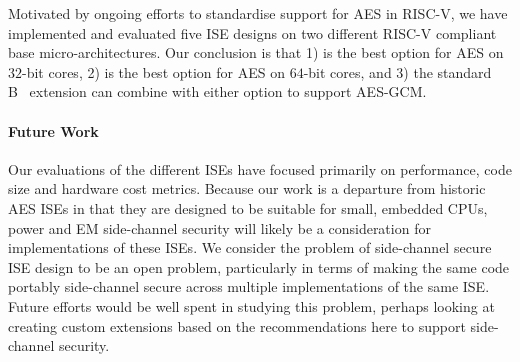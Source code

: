 

Motivated by ongoing efforts to standardise support 
for AES in RISC-V, we have implemented and evaluated five ISE designs 
on two different RISC-V compliant base micro-architectures.
Our conclusion is that
1) 
   is the best option for 
   AES on $32$-bit cores,
2) 
   is the best option for 
   AES on $64$-bit cores,
   and
3) the
   standard 
   B~\cite[Section 17]{RV:ISA:I:19}
   extension
   can combine with either option to support AES-GCM.

\paragraph{Future Work}
Our evaluations of the different ISEs have focused primarily on
performance, code size and hardware cost metrics.
Because our work is a departure from historic
AES ISEs in that they are designed to be suitable for small, embedded
CPUs, power and EM side-channel security will likely be a consideration
for implementations of these ISEs.
We consider the problem of side-channel secure ISE design to be an
open problem, particularly in terms of making the same code portably
side-channel secure across multiple implementations of the same ISE.
Future efforts would be well spent in studying this problem, perhaps
looking at creating custom extensions based on the recommendations here
to support side-channel security.

%

